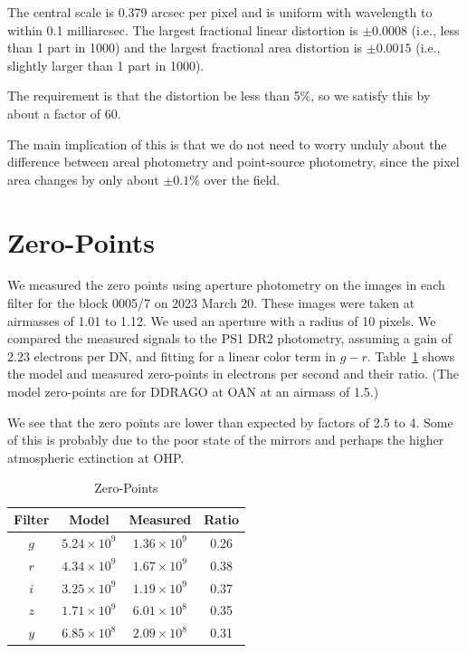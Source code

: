\documentclass{article}
\begin{document}
The central scale is 0.379 arcsec per pixel and is uniform with wavelength to within 0.1 milliarcsec. The largest fractional linear distortion is $\pm 0.0008$ (i.e., less than 1 part in 1000) and the largest fractional area distortion is $\pm0.0015$ (i.e., slightly larger than 1 part in 1000).

The requirement is that the distortion be less than 5\%, so we satisfy this by about a factor of 60.

The main implication of this is that we do not need to worry unduly about the difference between areal photometry and point-source photometry, since the pixel area changes by only about $\pm0.1\%$ over the field.

\clearpage
\section{Zero-Points}

We measured the zero points using aperture photometry on the images in each filter for the block 0005/7 on 2023 March 20. These images were taken at airmasses of 1.01 to 1.12. We used an aperture with a radius of 10 pixels. We compared the measured signals to the PS1 DR2 photometry, assuming a gain of 2.23 electrons per DN, and fitting for a linear color term in $g-r$. Table~\ref{table:zero-points} shows the model \cite{expected} and measured zero-points in electrons per second and their ratio. (The model zero-points are for DDRAGO at OAN at an airmass of 1.5.)

We see that the zero points are lower than expected by factors of 2.5 to 4. Some of this is probably due to the poor state of the mirrors and perhaps the higher atmospheric extinction at OHP.

\begin{table}[pb]
\begin{center}
\caption{Zero-Points}
\label{table:zero-points}
\begin{tabular}{cccc}
\hline
Filter&Model&Measured& Ratio\\
\hline
$g$  &$5.24 \times 10^{9}$ & $1.36 \times 10^{9}$ & 0.26\\
$r$  &$4.34 \times 10^{9}$ & $1.67 \times 10^{9}$ & 0.38\\
$i$  &$3.25 \times 10^{9}$ & $1.19 \times 10^{9}$ & 0.37\\
$z$  &$1.71 \times 10^{9}$ & $6.01 \times 10^{8}$ & 0.35\\
$y$  &$6.85 \times 10^{8}$ & $2.09 \times 10^{8}$ & 0.31\\
\hline
\end{tabular}
\end{center}
\end{table}
\end{document}
